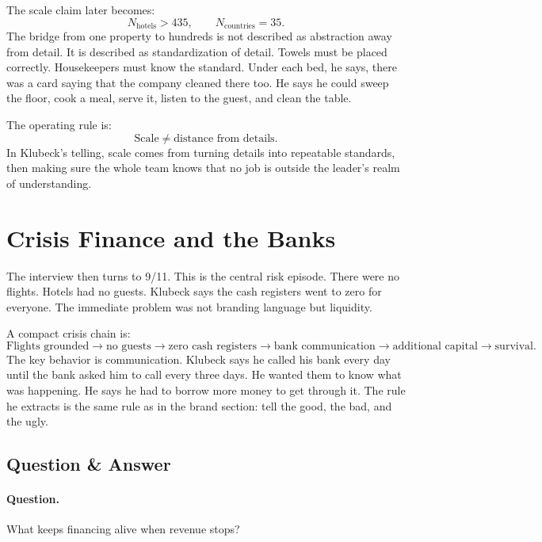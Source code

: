 The scale claim later becomes:
\begin{equation}
N_{\text{hotels}}>435,
\qquad
N_{\text{countries}}=35.
\end{equation}
The bridge from one property to hundreds is not described as abstraction away from detail. It is described as standardization of detail. Towels must be placed correctly. Housekeepers must know the standard. Under each bed, he says, there was a card saying that the company cleaned there too. He says he could sweep the floor, cook a meal, serve it, listen to the guest, and clean the table.

The operating rule is:
\begin{equation}
\text{Scale}
\neq
\text{distance from details}.
\end{equation}
In Klubeck's telling, scale comes from turning details into repeatable standards, then making sure the whole team knows that no job is outside the leader's realm of understanding.

\section{Crisis Finance and the Banks}

The interview then turns to 9/11. This is the central risk episode. There were no flights. Hotels had no guests. Klubeck says the cash registers went to zero for everyone. The immediate problem was not branding language but liquidity.

A compact crisis chain is:
\begin{equation}
\text{Flights grounded}
\rightarrow
\text{no guests}
\rightarrow
\text{zero cash registers}
\rightarrow
\text{bank communication}
\rightarrow
\text{additional capital}
\rightarrow
\text{survival}.
\end{equation}
The key behavior is communication. Klubeck says he called his bank every day until the bank asked him to call every three days. He wanted them to know what was happening. He says he had to borrow more money to get through it. The rule he extracts is the same rule as in the brand section: tell the good, the bad, and the ugly.

\subsection{Question \& Answer}

\paragraph{Question.}
What keeps financing alive when revenue stops?

